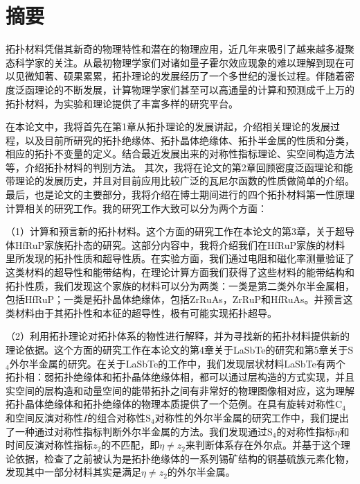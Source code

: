 \documentclass[twoside]{Style/ucasthesis}
\begin{document}
\frontmatter%
\maketitle%
\MAKETITLE%
\makedeclaration%
\intobmk\chapter*{摘\quad 要}%
\setcounter{page}{1}%
拓扑材料凭借其新奇的物理特性和潜在的物理应用，近几年来吸引了越来越多凝聚态科学家的关注。从最初物理学家们对诸如量子霍尔效应现象的难以理解到现在可以见微知著、硕果累累，拓扑理论的发展经历了一个多世纪的漫长过程。伴随着密度泛函理论的不断发展，计算物理学家们甚至可以高通量的计算和预测成千上万的拓扑材料，为实验和理论提供了丰富多样的研究平台。

在本论文中，我将首先在第1章从拓扑理论的发展讲起，介绍相关理论的发展过程，以及目前所研究的拓扑绝缘体、拓扑晶体绝缘体、拓扑半金属的性质和分类，相应的拓扑不变量的定义。结合最近发展出来的对称性指标理论、实空间构造方法等，介绍拓扑材料的判别方法。 其次，我将在论文的第2章回顾密度泛函理论和能带理论的发展历史，并且对目前应用比较广泛的瓦尼尔函数的性质做简单的介绍。最后，也是论文的主要部分，我将介绍在博士期间进行的四个拓扑材料第一性原理计算相关的研究工作。我的研究工作大致可以分为两个方面：

（1）计算和预言新的拓扑材料。这个方面的研究工作在本论文的第3章，关于超导体HfRuP家族拓扑态的研究。这部分内容中，我将介绍我们在HfRuP家族的材料里所发现的拓扑性质和超导性质。在实验方面，我们通过电阻和磁化率测量验证了这类材料的超导性和能带结构，在理论计算方面我们获得了这些材料的能带结构和拓扑性质，我们发现这个家族的材料可以分为两类：一类是第二类外尔半金属相，包括HfRuP；一类是拓扑晶体绝缘体，包括ZrRuAs，ZrRuP和HfRuAs。并预言这类材料由于其拓扑性和本征的超导性，极有可能实现拓扑超导。

（2）利用拓扑理论对拓扑体系的物性进行解释，并为寻找新的拓扑材料提供新的理论依据。这个方面的研究工作在本论文的第4章关于LaSbTe的研究和第5章关于S$_4$外尔半金属的研究。在关于LaSbTe的工作中，我们发现层状材料LaSbTe有两个拓扑相：弱拓扑绝缘体和拓扑晶体绝缘体相，都可以通过层构造的方式实现，并且实空间的层构造和动量空间的能带拓扑之间有非常好的物理图像相对应，这为理解拓扑晶体绝缘体和拓扑绝缘体的物理本质提供了一个范例。在具有旋转对称性C$_4$和空间反演对称性$I$的组合对称性S$_4$对称性的外尔半金属的研究工作中，我们提出了一种通过对称性指标判断外尔半金属的方法。我们发现通过S$_4$的对称性指标$\eta$和时间反演对称性指标$z_2$的不匹配，即$\eta \neq z_2$来判断体系存在外尔点。并基于这个理论依据，检查了之前被认为是拓扑绝缘体的一系列锡矿结构的铜基硫族元素化物，发现其中一部分材料其实是满足$\eta \neq z_2$的外尔半金属。
\end{document}
